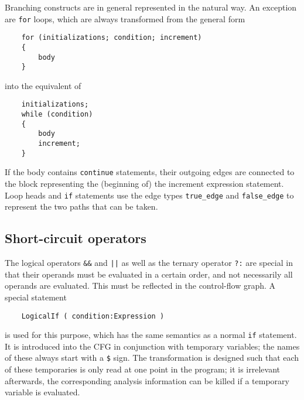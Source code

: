 Branching constructs are in general represented in the natural way.
An exception are \lstinline|for| loops, which are always transformed
from the general form
\begin{lstlisting}
    for (initializations; condition; increment)
    {
        body
    }
\end{lstlisting}
into the equivalent of
\begin{lstlisting}
    initializations;
    while (condition)
    {
        body
        increment;
    }
\end{lstlisting}
If the body contains \lstinline|continue| statements, their outgoing
edges are connected to the block representing the (beginning of) the
increment expression statement. Loop heads and \lstinline|if|
statements use the edge types \verb|true_edge| and \verb|false_edge|
to represent the two paths that can be taken.

\subsection{Short-circuit operators}

The logical operators \lstinline|&&| and \lstinline&||& as well as
the ternary operator \lstinline|?:| are special in that their
operands must be evaluated in a certain order, and not necessarily
all operands are evaluated. This must be reflected in the
control-flow graph. A special statement
\begin{verbatim}
    LogicalIf ( condition:Expression )
\end{verbatim}
is used for this purpose, which has the same semantics as a normal
\lstinline|if| statement. It is introduced into the CFG in
conjunction with temporary variables; the names of these always
start with a \lstinline|$| sign. The transformation is designed such
that each of these temporaries is only read at one point in the
program; it is irrelevant afterwards, the corresponding analysis
information can be killed if a temporary variable is evaluated.

